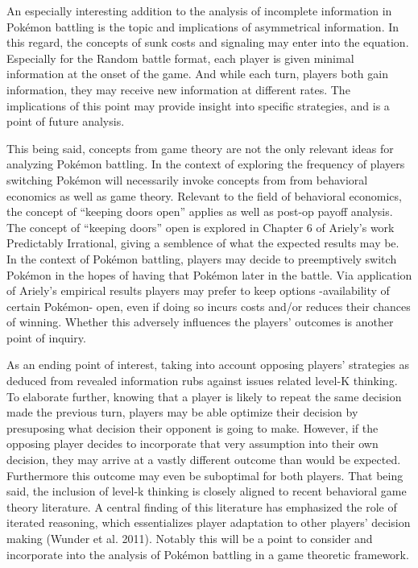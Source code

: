 \documentclass[12pt,twoside]{reedthesis}
\begin{document}
  An especially interesting addition to the analysis of incomplete
  information in Pokémon battling is the topic and implications of
  asymmetrical information. In this regard, the concepts of sunk costs and
  signaling may enter into the equation. Especially for the Random battle
  format, each player is given minimal information at the onset of the
  game. And while each turn, players both gain information, they may
  receive new information at different rates. The implications of this
  point may provide insight into specific strategies, and is a point of
  future analysis.
  
  This being said, concepts from game theory are not the only relevant
  ideas for analyzing Pokémon battling. In the context of exploring the
  frequency of players switching Pokémon will necessarily invoke concepts
  from from behavioral economics as well as game theory. Relevant to the
  field of behavioral economics, the concept of ``keeping doors open''
  applies as well as post-op payoff analysis. The concept of ``keeping
  doors'' open is explored in Chapter 6 of Ariely's work Predictably
  Irrational, giving a semblence of what the expected results may be. In
  the context of Pokémon battling, players may decide to preemptively
  switch Pokémon in the hopes of having that Pokémon later in the battle.
  Via application of Ariely's empirical results players may prefer to keep
  options -availability of certain Pokémon- open, even if doing so incurs
  costs and/or reduces their chances of winning. Whether this adversely
  influences the players' outcomes is another point of inquiry.
  
  As an ending point of interest, taking into account opposing players'
  strategies as deduced from revealed information rubs against issues
  related level-K thinking. To elaborate further, knowing that a player is
  likely to repeat the same decision made the previous turn, players may
  be able optimize their decision by presuposing what decision their
  opponent is going to make. However, if the opposing player decides to
  incorporate that very assumption into their own decision, they may
  arrive at a vastly different outcome than would be expected. Furthermore
  this outcome may even be suboptimal for both players. That being said,
  the inclusion of level-k thinking is closely aligned to recent
  behavioral game theory literature. A central finding of this literature
  has emphasized the role of iterated reasoning, which essentializes
  player adaptation to other players' decision making (Wunder et al.
  2011). Notably this will be a point to consider and incorporate into the
  analysis of Pokémon battling in a game theoretic framework.
  
\end{document}

